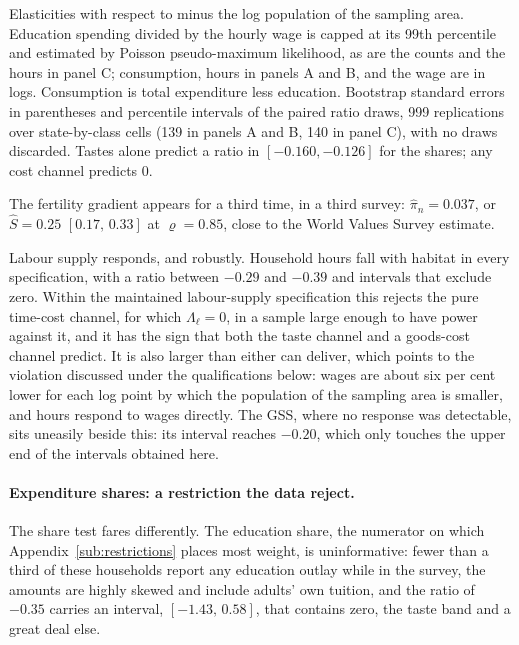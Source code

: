 \documentclass[11pt]{article}
\begin{document}
\begin{table}[h!]
\begin{threeparttable}
\begin{tablenotes}
\item Elasticities with respect to minus the log population of the sampling area. Education
spending divided by the hourly wage is capped at its 99th percentile and estimated by Poisson
pseudo-maximum likelihood, as are the counts and the hours in panel C; consumption, hours in panels A and B, and the wage are
in logs. Consumption is total expenditure less education. Bootstrap standard errors in
parentheses and percentile intervals of the paired ratio draws, 999 replications over state-by-class
cells (139 in panels A and B, 140 in panel C), with no draws discarded. Tastes alone predict a ratio in
$[-0.160,-0.126]$ for the shares; any cost channel predicts $0$.
\end{tablenotes}
\end{threeparttable}
\end{table}

The fertility gradient appears for a third time, in a third survey: $\hat\pi_n=0.037$, or
$\hat S=0.25$ $[0.17,\,0.33]$ at $\varrho=0.85$, close to the World Values Survey estimate.

Labour supply responds, and robustly. Household hours fall with habitat in every specification,
with a ratio between $-0.29$ and $-0.39$ and intervals that exclude zero. Within the maintained
labour-supply specification this rejects the pure time-cost channel, for which $\Lambda_\ell=0$, in a
sample large enough to have power against it,
and it has the sign that both the taste channel and a goods-cost channel predict. It is also
larger than either can deliver, which points to the violation discussed under the qualifications
below: wages are about six per cent lower for each log point by which the population of the sampling
area is smaller, and hours respond to wages directly.
The GSS, where no response was detectable, sits uneasily beside this: its interval reaches
$-0.20$, which only touches the upper end of the intervals obtained here.

\paragraph{Expenditure shares: a restriction the data reject.}
The share test fares differently. The education share, the numerator on which
Appendix~\ref{sub:restrictions} places most weight, is uninformative: fewer than a third of these
households report any education outlay while in the survey, the amounts are highly skewed and
include adults' own tuition, and the ratio of $-0.35$ carries an interval, $[-1.43,\,0.58]$, that
contains zero, the taste band and a great deal else.
\end{document}
